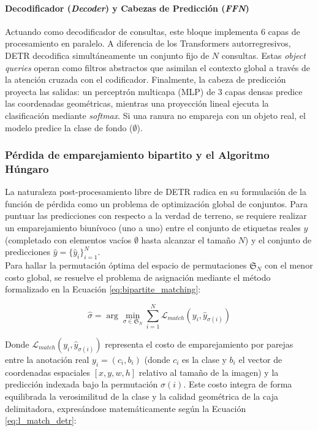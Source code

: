 \paragraph{Decodificador (\textit{Decoder}) y Cabezas de Predicción (\textit{FFN})}

Actuando como decodificador de consultas, este bloque implementa 6 capas de procesamiento en paralelo. A diferencia de los Transformers autorregresivos, DETR decodifica simultáneamente un conjunto fijo de $N$ consultas. Estas \textit{object queries} operan como filtros abstractos que asimilan el contexto global a través de la atención cruzada con el codificador. Finalmente, la cabeza de predicción proyecta las salidas: un perceptrón multicapa (MLP) de 3 capas densas predice las coordenadas geométricas, mientras una proyección lineal ejecuta la clasificación mediante \textit{softmax}. Si una ranura no empareja con un objeto real, el modelo predice la clase de fondo ($\emptyset$).\\

\subsubsection{Pérdida de emparejamiento bipartito y el Algoritmo Húngaro}

La naturaleza post-procesamiento libre de DETR radica en su formulación de la función de pérdida como un problema de optimización global de conjuntos. Para puntuar las predicciones con respecto a la verdad de terreno, se requiere realizar un emparejamiento biunívoco (uno a uno) entre el conjunto de etiquetas reales $y$ (completado con elementos vacíos $\emptyset$ hasta alcanzar el tamaño $N$) y el conjunto de predicciones $\hat{y} = \{\hat{y}_i\}_{i=1}^N$.\\

Para hallar la permutación óptima del espacio de permutaciones $\mathfrak{S}_N$ con el menor costo global, se resuelve el problema de asignación mediante el método formalizado en la Ecuación \ref{eq:bipartite_matching}:

\begin{equation}
    \hat{\sigma} = \arg\min_{\sigma \in \mathfrak{S}_N} \sum_{i=1}^N \mathcal{L}_{match}(y_i, \hat{y}_{\sigma(i)})
    \label{eq:bipartite_matching}
\end{equation}

Donde $\mathcal{L}_{match}(y_i, \hat{y}_{\sigma(i)})$ representa el costo de emparejamiento por parejas entre la anotación real $y_i = (c_i, b_i)$ (donde $c_i$ es la clase y $b_i$ el vector de coordenadas espaciales $[x, y, w, h]$ relativo al tamaño de la imagen) y la predicción indexada bajo la permutación $\sigma(i)$. Este costo integra de forma equilibrada la verosimilitud de la clase y la calidad geométrica de la caja delimitadora, expresándose matemáticamente según la Ecuación \ref{eq:l_match_detr}:


